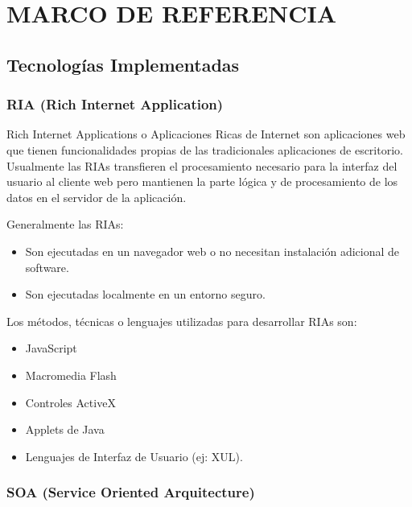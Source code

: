\section{MARCO DE REFERENCIA}

\subsection{Tecnologías Implementadas}

\label{tec:all}

\subsubsection*{RIA (Rich Internet Application)}
\label{tec:ria}

Rich Internet Applications o Aplicaciones Ricas de Internet son aplicaciones web que tienen funcionalidades propias de las tradicionales aplicaciones de escritorio. Usualmente las RIAs transfieren el procesamiento necesario para la interfaz del usuario al cliente web pero mantienen la parte lógica y de procesamiento de los datos en el servidor de la aplicación.

Generalmente las RIAs:

\begin{itemize}
	
	\item Son ejecutadas en un navegador web o no necesitan instalación adicional de software.
	
	\item Son ejecutadas localmente en un entorno seguro.
	
\end{itemize}

Los métodos, técnicas o lenguajes utilizadas para desarrollar RIAs son:

\begin{itemize}
	\item JavaScript
	\item Macromedia Flash
	\item Controles ActiveX
	\item Applets de Java
	\item Lenguajes de Interfaz de Usuario (ej: XUL).
\end{itemize}

\subsubsection*{SOA (Service Oriented Arquitecture)}
\label{tec:soa}

